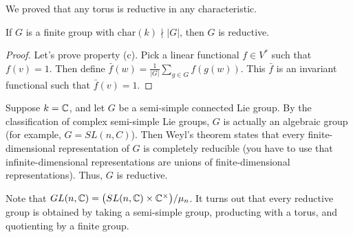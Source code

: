 \begin{example}
 We proved that any torus is reductive in any characteristic.
\end{example}
\begin{theorem}\label{lec2Thm:Maschke}
 If $G$ is a finite group with $\mathrm{char}(k)\nmid |G|$, then $G$ is reductive.
\end{theorem}
\begin{proof}
 Let's prove property (c). Pick a linear functional $f\in V^*$ such that $f(v)=1$. Then define $\bar f(w) = \frac{1}{|G|}\sum_{g\in G} f(g(w))$. This $\bar f$ is an invariant functional such that $\bar f(v)=1$.
\end{proof}
\begin{example}
 Suppose $k=\mathbb{C}$, and let $G$ be a semi-simple connected Lie group. By the classification of complex semi-simple Lie groups, $G$ is actually an algebraic group (for example, $G=SL(n,C)$). Then Weyl's theorem states that every finite-dimensional representation of $G$ is completely reducible (you have to use that infinite-dimensional representations are unions of finite-dimensional representations). Thus, $G$ is reductive.
\end{example}
Note that $GL(n,\mathbb{C})=\bigl(SL(n,\mathbb{C})\times \mathbb{C}^\times\bigr)/\mu_n$. It turns out that every reductive group is obtained by taking a semi-simple group, producting with a torus, and quotienting by a finite group.












